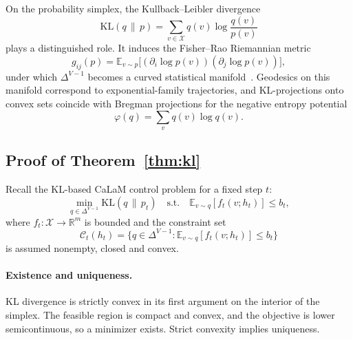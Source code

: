 \documentclass{article}
\theoremstyle{plain}
\theoremstyle{definition}
\theoremstyle{remark}
\begin{document}
On the probability simplex, the Kullback–Leibler divergence
\begin{equation}
  \mathrm{KL}(q \,\|\, p)
  =
  \sum_{v \in \mathcal{X}} q(v)\log\frac{q(v)}{p(v)}
\end{equation}
plays a distinguished role.
It induces the Fisher--Rao Riemannian metric
\begin{equation}
  g_{ij}(p)
  =
  \mathbb{E}_{v \sim p}
  \big[
    (\partial_i \log p(v))(\partial_j \log p(v))
  \big],
\end{equation}
under which $\Delta^{V-1}$ becomes a curved statistical manifold~\citep{amari2000information,amari2016information}.
Geodesics on this manifold correspond to exponential-family trajectories, and KL-projections onto convex sets coincide with Bregman projections for the negative entropy potential
\begin{equation}
  \varphi(q)
  =
  \sum_{v} q(v)\log q(v).
\end{equation}

\subsection{Proof of Theorem~\ref{thm:kl}}

Recall the KL-based CaLaM control problem for a fixed step $t$:
\begin{equation}
  \min_{q \in \Delta^{V-1}}
    \mathrm{KL}(q \,\|\, p_t)
  \quad \text{s.t.} \quad
    \mathbb{E}_{v \sim q}[f_t(v; h_t)] \le b_t,
  \label{eq:kl-problem-app}
\end{equation}
where $f_t : \mathcal{X} \to \mathbb{R}^m$ is bounded and the constraint set
\begin{equation}
  \mathcal{C}_t(h_t)
  =
  \Big\{
    q \in \Delta^{V-1}:
    \mathbb{E}_{v \sim q}[f_t(v; h_t)] \le b_t
  \Big\}
\end{equation}
is assumed nonempty, closed and convex.

\paragraph{Existence and uniqueness.}
KL divergence is strictly convex in its first argument on the interior of the simplex.
The feasible region is compact and convex, and the objective is lower semicontinuous, so a minimizer exists.
Strict convexity implies uniqueness.
\end{document}

